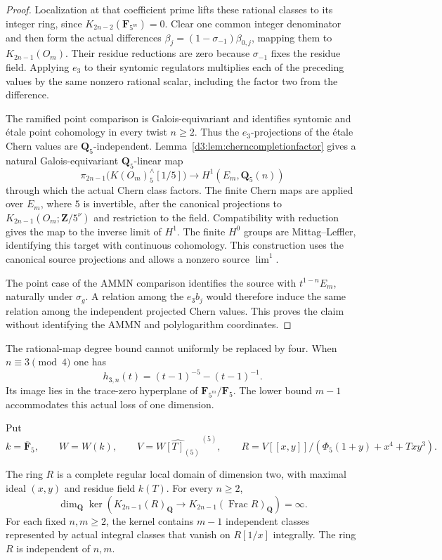 \begin{proof}
Localization at that coefficient prime lifts these rational
classes to its integer ring, since
$K_{2n-2}(\mathbf F_{5^m})=0$.
Clear one common integer denominator and then form the actual
differences
$\beta_j=(1-\sigma_{-1})\beta_{0,j}$, mapping them to $K_{2n-1}(O_m)$.
Their residue reductions are zero because $\sigma_{-1}$ fixes
the residue field.  Applying $e_3$ to their syntomic regulators
multiplies each of the preceding values by the same nonzero
rational scalar, including the factor two from the difference.

The ramified point comparison
\cite[Example~2.2.4 and Propositions~2.2.7, 2.2.9, 2.3.4]{HuberKings}
is Galois-equivariant and identifies syntomic and \'etale point
cohomology in every twist $n\geq2$.  Thus the $e_3$-projections
of the \'etale Chern values are $\mathbf Q_5$-independent.
Lemma~\ref{d3:lem:cherncompletionfactor} gives a natural
Galois-equivariant $\mathbf Q_5$-linear map
\[
 \pi_{2n-1}\bigl(K(O_m)^\wedge_5[1/5]\bigr)
       \longrightarrow H^1(E_m,\mathbf Q_5(n))
\]
through which the actual Chern class factors. The finite Chern
maps are applied over $E_m$, where $5$ is invertible, after the
canonical projections to $K_{2n-1}(O_m;\mathbf Z/5^\nu)$ and
restriction to the field. Compatibility with reduction gives the
map to the inverse limit of $H^1$. The finite $H^0$ groups are
Mittag--Leffler, identifying this target with continuous cohomology.
This construction uses the canonical source projections and
allows a nonzero source $\lim^1$.

The point case of the AMMN comparison identifies the source with
$t^{1-n}E_m$, naturally under $\sigma_g$.  A relation among the
$e_3b_j$ would therefore induce the same relation among the
independent projected Chern values.  This proves the claim
without identifying the AMMN and polylogarithm coordinates.
\end{proof}

\begin{remark}
The rational-map degree bound cannot uniformly be replaced by four.
When $n\equiv3\pmod4$ one has
\[
 h_{3,n}(t)=(t-1)^{-5}-(t-1)^{-1}.
\]
Its image lies in the trace-zero hyperplane of
$\mathbf F_{5^m}/\mathbf F_5$.  The lower bound $m-1$ accommodates
this actual loss of one dimension.
\end{remark}

Put
\[
 k=\overline{\mathbf F}_5,\qquad W=W(k),\qquad
 V=\widehat{W[T]_{(5)}}^{\,(5)},\qquad
 R=V[[x,y]]/(\Phi_5(1+y)+x^4+Txy^3).
\]

\begin{theorem}
\label{d2ext:dimtwoCompleteAllOddInfiniteRank}
The ring $R$ is a complete regular local domain of dimension two,
with maximal ideal $(x,y)$ and residue field $k(T)$.
For every $n\geq2$,
\[
 \dim_{\mathbf Q}\ker\left(
 K_{2n-1}(R)_{\mathbf Q}\longrightarrow
 K_{2n-1}(\operatorname{Frac}R)_{\mathbf Q}\right)=\infty.
\]
For each fixed $n,m\geq2$, the kernel contains $m-1$ independent
classes represented by actual integral classes that vanish on
$R[1/x]$ integrally.  The ring $R$ is independent of $n,m$.
\end{theorem}

